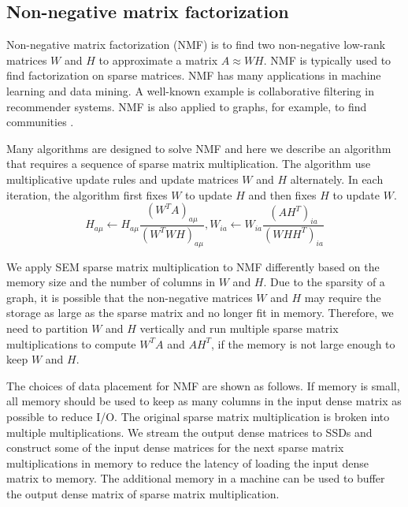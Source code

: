\subsection{Non-negative matrix factorization}
Non-negative matrix factorization (NMF) \cite{nmf} is to find two non-negative
low-rank matrices $W$ and $H$ to approximate a matrix $A \approx WH$. NMF is
typically used to find factorization on sparse matrices. NMF has many applications
in machine learning
and data mining. A well-known example is collaborative filtering \cite{cf} in
recommender systems. NMF is also applied to graphs, for example, to find communities
\cite{yang13, wang11}.

Many algorithms are designed to solve NMF and here we describe an algorithm
\cite{nmf} that requires a sequence of sparse matrix multiplication.
The algorithm use multiplicative update rules and update matrices $W$ and $H$
alternately. In each iteration, the algorithm first fixes $W$ to update $H$
and then fixes $H$ to update $W$.
\begin{equation*}
H_{a\mu} \leftarrow H_{a\mu} \frac{{(W^TA)}_{a\mu}}{{(W^TWH)}_{a\mu}},
W_{ia} \leftarrow W_{ia} \frac{{(AH^T)}_{ia}}{{(WHH^T)}_{ia}}
\end{equation*}

We apply SEM sparse matrix multiplication to NMF differently
based on the memory size and the number of columns in $W$ and $H$. Due to
the sparsity of a graph, it is possible that the non-negative matrices $W$ and
$H$ may require the storage as large as the sparse matrix and no longer fit in
memory. Therefore, we need to partition $W$ and $H$ vertically and run multiple
sparse matrix multiplications to compute $W^TA$ and $AH^T$, if the memory is not
large enough to keep $W$ and $H$.

The choices of data placement for NMF are
shown as follows. If memory is small, all memory should be used to keep as many
columns in the input dense matrix as possible to reduce I/O. The original sparse
matrix multiplication is broken into multiple multiplications. We stream the output
dense matrices to SSDs and construct some of the input dense matrices for the next
sparse matrix multiplications in memory to reduce the latency of loading
the input dense matrix to memory. The additional memory in a machine can be used
to buffer the output dense matrix of sparse matrix multiplication.
